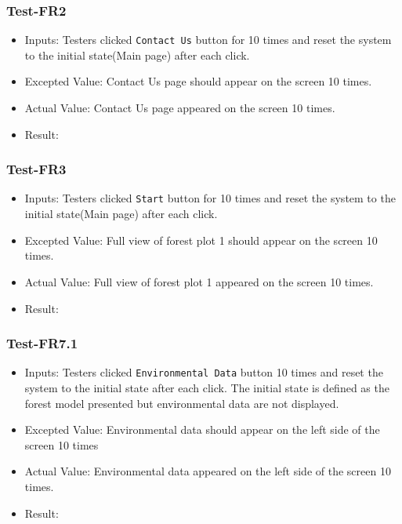 \documentclass[12pt, titlepage]{article}
\begin{document}
\subsubsection{Test-FR2}
\begin{itemize}
\item Inputs: Testers clicked \verb|Contact Us| button
for 10 times and reset the system to the initial 
state(Main page) after each click.
\item Excepted Value: Contact Us page should appear 
on the screen 10 times.
\item Actual Value: Contact Us page appeared on the 
screen 10 times.
\item Result: \pass
\end{itemize}

\subsubsection{Test-FR3}
\begin{itemize}
\item Inputs: Testers clicked \verb|Start| button
for 10 times and reset the system to the initial 
state(Main page) after each click.
\item Excepted Value: Full view of forest plot 1 should appear on
the screen 10 times.
\item Actual Value: Full view of forest plot 1 appeared on the screen 
10 times.
\item Result: \pass
\end{itemize}


\subsubsection{Test-FR7.1}
\begin{itemize}
\item Inputs: Testers clicked \verb|Environmental Data| button
10 times and reset the system to the initial state after each click.
The initial state is defined as the forest model presented but
environmental data are not displayed.
\item Excepted Value: Environmental data should appear on the left side
of the screen 10 times
\item Actual Value: Environmental data appeared on the left side of the
screen 10 times.
\item Result: \pass
\end{itemize}
\end{document}
